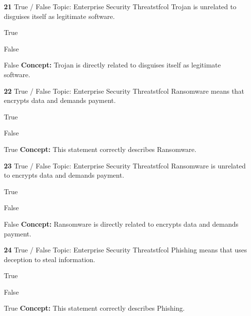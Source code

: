 \documentclass[10pt,a4paper]{article}
\begin{document}
\begin{qcard}{\color{white}\textbf{21} \hfill \small True / False \textbar{} Topic: Enterprise Security Threats}{tfcol}
Trojan is unrelated to disguises itself as legitimate software.

\begin{qoptions}
\item True
\item False
\end{qoptions}
\begin{explainbox}{False}
\textbf{Concept:} Trojan is directly related to disguises itself as legitimate software.
\end{explainbox}
\end{qcard}

\begin{qcard}{\color{white}\textbf{22} \hfill \small True / False \textbar{} Topic: Enterprise Security Threats}{tfcol}
Ransomware means that encrypts data and demands payment.

\begin{qoptions}
\item True
\item False
\end{qoptions}
\begin{explainbox}{True}
\textbf{Concept:} This statement correctly describes Ransomware.
\end{explainbox}
\end{qcard}

\begin{qcard}{\color{white}\textbf{23} \hfill \small True / False \textbar{} Topic: Enterprise Security Threats}{tfcol}
Ransomware is unrelated to encrypts data and demands payment.

\begin{qoptions}
\item True
\item False
\end{qoptions}
\begin{explainbox}{False}
\textbf{Concept:} Ransomware is directly related to encrypts data and demands payment.
\end{explainbox}
\end{qcard}

\begin{qcard}{\color{white}\textbf{24} \hfill \small True / False \textbar{} Topic: Enterprise Security Threats}{tfcol}
Phishing means that uses deception to steal information.

\begin{qoptions}
\item True
\item False
\end{qoptions}
\begin{explainbox}{True}
\textbf{Concept:} This statement correctly describes Phishing.
\end{explainbox}
\end{qcard}
\end{document}
